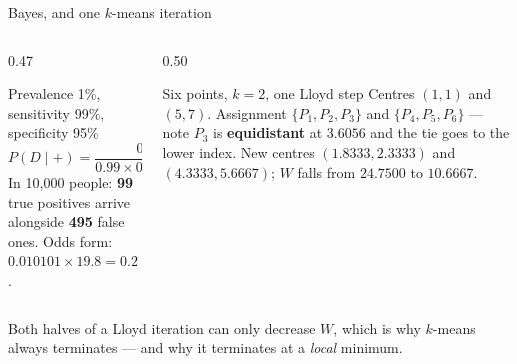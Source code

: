 \documentclass[aspectratio=169]{beamer}
\begin{document}
\begin{frame}[shrink=6]{Bayes, and one $k$-means iteration}
  \begin{columns}[T]
    \begin{column}{0.47\textwidth}
      \begin{block}{Prevalence 1\%, sensitivity 99\%, specificity 95\%}
        \[
          P(D \mid +) = \frac{0.99 \times 0.01}{0.99 \times 0.01 +
                              0.05 \times 0.99} = \frac{0.0099}{0.0594}
                      = 0.1667
        \]
        In 10{,}000 people: \textbf{99} true positives arrive alongside
        \textbf{495} false ones. Odds form: $0.010101 \times 19.8 = 0.2$.
      \end{block}
    \end{column}
    \begin{column}{0.50\textwidth}
      \begin{block}{Six points, $k=2$, one Lloyd step}
        Centres $(1,1)$ and $(5,7)$.
        Assignment $\{P_1,P_2,P_3\}$ and $\{P_4,P_5,P_6\}$ --- note $P_3$ is
        \textbf{equidistant} at $3.6056$ and the tie goes to the lower index.
        New centres $(1.8333, 2.3333)$ and $(4.3333, 5.6667)$; $W$ falls from
        $24.7500$ to $\mathbf{10.6667}$.
      \end{block}
    \end{column}
  \end{columns}
  \vspace{0.2em}
  \begin{center}
    \small Both halves of a Lloyd iteration can only decrease $W$, which is
    why $k$-means always terminates --- and why it terminates at a
    \emph{local} minimum.
  \end{center}
\end{frame}
\end{document}
